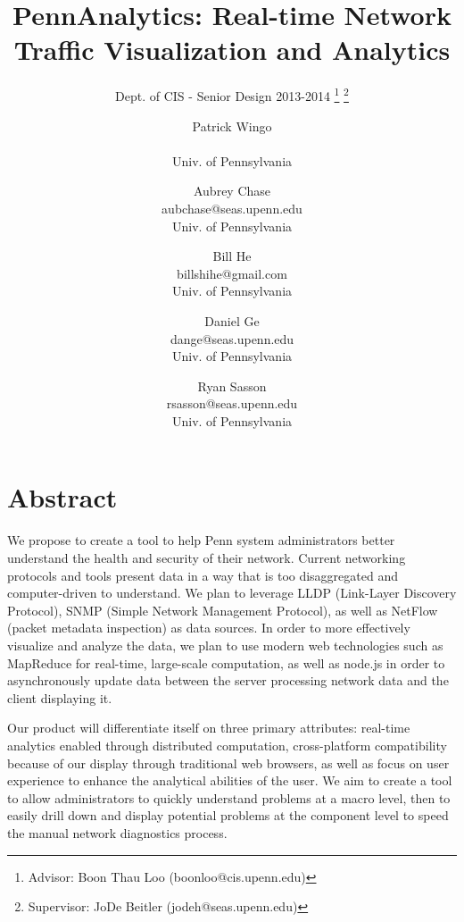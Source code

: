 \documentclass{sig-alternate}
\begin{document}
\title{PennAnalytics: Real-time Network Traffic Visualization and Analytics}
\subtitle{Dept. of CIS - Senior Design 2013-2014
    \thanks{Advisor: Boon Thau Loo (boonloo@cis.upenn.edu)}
    \thanks{Supervisor: JoDe Beitler (jodeh@seas.upenn.edu)}}
\author{Patrick Wingo\\ \\ Univ. of Pennsylvania
    \and Aubrey Chase\\ aubchase@seas.upenn.edu\\ Univ. of Pennsylvania
    \and Bill He\\ billshihe@gmail.com\\ Univ. of Pennsylvania
    \and Daniel Ge\\ dange@seas.upenn.edu\\ Univ. of Pennsylvania
    \and Ryan Sasson\\ rsasson@seas.upenn.edu\\ Univ. of Pennsylvania}

\maketitle

\section*{Abstract}

We propose to create a tool to help Penn system administrators better understand
the health and security of their network.  Current networking protocols and
tools present data in a way that is too disaggregated and computer-driven to
understand. We plan to leverage LLDP (Link-Layer Discovery Protocol), SNMP
(Simple Network Management Protocol), as well as NetFlow (packet metadata
inspection) as data sources. In order to more effectively visualize and analyze
the data, we plan to use modern web technologies such as MapReduce for
real-time, large-scale computation, as well as node.js in order to
asynchronously update data between the server processing network data and the
client displaying it.

Our product will differentiate itself on three primary attributes: real-time
analytics enabled through distributed computation, cross-platform compatibility
because of our display through traditional web browsers, as well as focus on
user experience to enhance the analytical abilities of the user. We aim to
create a tool to allow administrators to quickly understand problems at a macro
level, then to easily drill down and display potential problems at the component
level to speed the manual network diagnostics process.
\end{document}
